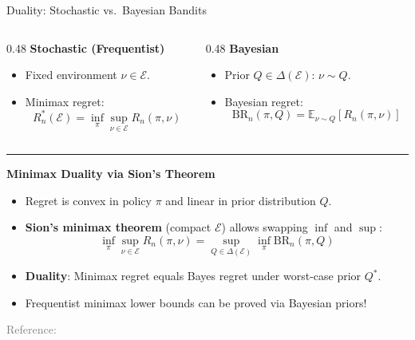 \documentclass[18pt,aspectratio=149]{beamer}
\begin{document}
\begin{frame}{Duality: Stochastic vs.\ Bayesian Bandits}
    \begin{columns}[T,onlytextwidth]
        \begin{column}{0.48\textwidth}
            \textbf{Stochastic (Frequentist)}
            \begin{itemize}
                \item Fixed environment $\nu \in \mathcal{E}$.
                \item Minimax regret:
                \vspace{-0.4em}
                \[
                    R_n^*(\mathcal{E}) = \inf_{\pi} \sup_{\nu \in \mathcal{E}} R_n(\pi, \nu)
                \]
            \end{itemize}
        \end{column}

        \begin{column}{0.48\textwidth}
            \textbf{Bayesian}
            \begin{itemize}
                \item Prior $Q \in \Delta(\mathcal{E})$: $\nu \sim Q$.
                \item Bayesian regret:
                \vspace{-0.4em}
                \[
                    \mathrm{BR}_n(\pi, Q) = \mathbb{E}_{\nu \sim Q} [R_n(\pi, \nu)]
                \]
            \end{itemize}
        \end{column}
    \end{columns}

    \vspace{0.3em}
    \hrule
    \vspace{0.3em}

    \textbf{Minimax Duality via Sion's Theorem}
    \begin{itemize}
        \item Regret is convex in policy $\pi$ and linear in prior distribution $Q$.
        \item \textbf{Sion's minimax theorem} (compact $\mathcal{E}$) allows swapping $\inf$ and $\sup$:
        \vspace{-0.4em}
        \[
            \inf_{\pi} \sup_{\nu \in \mathcal{E}} R_n(\pi, \nu)
            = \sup_{Q \in \Delta(\mathcal{E})} \inf_{\pi} \mathrm{BR}_n(\pi, Q)
        \]
        \vspace{-0.6em}
        \item \textbf{Duality}: Minimax regret equals Bayes regret under worst-case prior $Q^*$.
        \item Frequentist minimax lower bounds can be proved via Bayesian priors!
    \end{itemize}

    \vspace{0.2em}
    {\tiny \textcolor{gray}{Reference: \cite{lattimore_bandit_2020}}}
\end{frame}
\end{document}
